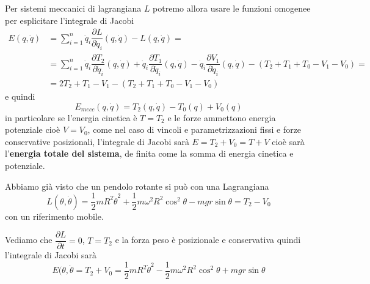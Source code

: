 \documentclass[11pt,a4paper,twoside]{book}
\newenvironment{esempio}[1][Esempio]{ 
  \begin{center}\begin{tcolorbox}[
  title={#1:\\},
  width=0.9\linewidth,
  flush right,
  enhanced jigsaw, 
  colback=white, 
  frame hidden, 
  sharpish corners, arc=3mm,
  borderline west = {1pt}{0pt}{gray},
  borderline south = {1pt}{0pt}{gray},
  coltitle=black, 
  fonttitle=\small\bfseries, 
  attach title to upper, 
  breakable,
  top=2.5pt, bottom=0.3pt]\small
  }{
 \normalsize \end{tcolorbox}\end{center}
}
\theoremstyle{esss}
\theoremstyle{dotless}
\numberwithin{equation}{section} %
\begin{document}
Per sistemi meccanici di lagrangiana $L$ potremo allora usare le funzioni omogenee per esplicitare l'integrale di Jacobi
\begin{align*}
E(q,\dot{q})&=\sum_{i=1}^n \dot{q}_i \dfrac{\partial L}{\partial \dot{q}_i}(q,\dot{q}) -L(q,\dot{q})=\\
& = \sum_{i=1}^n \dot{q}_i \dfrac{\partial T_2}{\partial \dot{q}_i}(q,\dot{q}) + \dot{q}_i \dfrac{\partial T_1}{\partial \dot{q}_i}(q,\dot{q}) - \dot{q}_i \dfrac{\partial V_1}{\partial \dot{q}_i}(q,\dot{q}) - \left( T_2+T_1+T_0-V_1-V_0\right) = \\
& = 2T_2 + T_1 - V_1 - \left( T_2+T_1+T_0-V_1-V_0\right) 
\end{align*}
e quindi
\begin{equation}
E_{mecc}(q,\dot{q})=T_2(q,\dot{q})-T_0(q)+V_0(q)
\end{equation}
in particolare se l'energia cinetica è $T=T_2$ e le forze ammettono energia potenziale cioè $V=V_0$, come nel caso di vincoli e parametrizzazioni fissi e forze conservative posizionali, l'integrale di Jacobi sarà $E=T_2+V_0=T+V$ cioè sarà l'\textbf{energia totale del sistema}, de
finita come la somma di energia cinetica e potenziale.

\begin{esempio}[Integrale di Jacobi del pendolo rotante]
Abbiamo già visto che un pendolo rotante si può con una Lagrangiana 
\[L(\theta,\dot{\theta})=\dfrac{1}{2}mR^2\dot{\theta}^2+\dfrac{1}{2}m\omega^2R^2\cos^2{\theta}-mgr\sin{\theta}=T_2-V_0\]
con un riferimento mobile.

Vediamo che $\dfrac{\partial L}{\partial t}=0$, $T=T_2$ e la forza peso è posizionale e conservativa quindi l'integrale di Jacobi sarà
\[
E(\theta,\dot{\theta}=T_2+V_0=\dfrac{1}{2}mR^2\dot{\theta}^2-\dfrac{1}{2}m\omega^2R^2\cos^2{\theta}+mgr\sin{\theta}
\]
\end{esempio}
\end{document}

